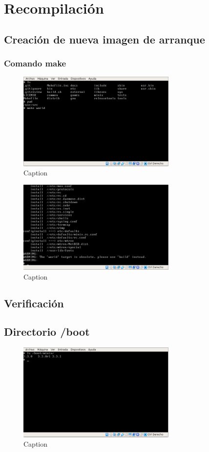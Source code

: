 \documentclass[12pt]{scrartcl}
\begin{document}
\section{Recompilación}

\subsection{Creación de nueva imagen de arranque}
\subsubsection{Comando make}
\begin{figure}[H]
  \centering
  \includegraphics[width=0.7\textwidth]{7.png}
  \caption{Caption}
\end{figure}
\begin{figure}[H]
  \centering
  \includegraphics[width=0.7\textwidth]{8.png}
  \caption{Caption}
\end{figure}
\subsection{Verificación}
\subsection{Directorio /boot}
\begin{figure}[H]
  \centering
  \includegraphics[width=0.7\textwidth]{12.png}
  \caption{Caption}
\end{figure}
\end{document}
